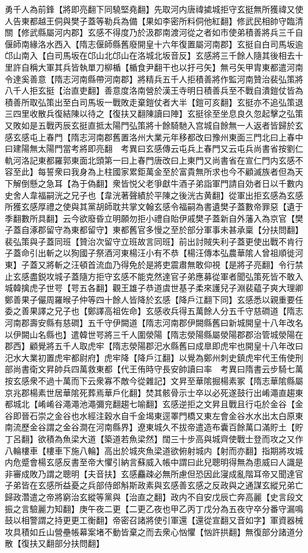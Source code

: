 勇千人為前鋒【將即亮翻下同驍堅堯翻】先取河内唐禕㨿城拒守玄挺無所獲禕又使人告東都越王侗與樊子蓋等勒兵為備【果如李密所料侗他紅翻】修武民相帥守臨清關【修武縣屬河内郡】玄感不得度乃於汲郡南渡河從之者如市使弟積善將兵三千自偃師南緣洛水西入【隋志偃師縣舊廢開皇十六年復置屬河南郡】玄挺自白司馬坂逾邙山南入【白司馬坂在邙山北邙山在洛城北坂音反】玄感將三千餘人隨其後相去十里許自稱大軍其兵皆執單刀柳楯【楯食尹翻干也以扜弓矢】無弓矢甲胄東都遣河南令達奚善意【隋志河南縣帶河南郡】將精兵五千人拒積善將作監河南贊治裴弘策將八千人拒玄挺【治直吏翻】善意度洛南營於漢王寺明日積善兵至不戰自潰鎧仗皆為積善所取弘策出至白司馬坂一戰敗走棄鎧仗者大半【鎧可亥翻】玄挺亦不追弘策退三四里收散兵復結陳以待之【復扶又翻陳讀曰陣】玄挺徐至坐息良久忽起擊之弘策又敗如是五戰丙辰玄挺直抵太陽門弘策將十餘騎馳入宫城自餘無一人返者皆歸於玄感玄感屯上春門【隋志河南郡舊置洛州大業元年移都改曰豫州東面三門北曰上春中曰建陽無太陽門當考將即亮翻　考異曰玄感傳云屯兵上春門又云屯兵尚書省按劉仁軌河洛記東都羅郭東面北頭第一曰上春門唐改曰上東門又尚書省在宣仁門内玄感不容至此】每誓衆曰我身為上柱國家累鉅萬金至於富貴無所求也今不顧滅族者但為天下解倒懸之急耳【為于偽翻】衆皆悦父老爭獻牛酒子弟詣軍門請自効者日以千數内史舍人韋福嗣洸之兄子也【韋洸著聲績於平陳之後洸古黄翻】從軍出拒玄感為玄感所獲玄感厚禮之使與其黨胡師耽共掌文翰玄感令福嗣為書遺樊子蓋數帝罪惡【遺于季翻數所具翻】云今欲廢昏立明願勿拒小禮自貽伊戚樊子蓋新自外藩入為京官【樊子蓋自涿郡留守為東都留守】東都舊官多慢之至於部分軍事未甚承稟【分扶問翻】裴弘策與子蓋同班【贊治次留守立班故言同班】前出討賊失利子蓋更使出戰不肯行子蓋命引出斬之以狥國子祭酒河東楊汪小有不恭【楊汪傳本弘農華隂人曾祖順徙河東】子蓋又將斬之汪頓首流血乃得免於是將吏震肅無敢仰視【是將子亮翻】令行禁止玄感盡鋭攻城子蓋隨方拒守玄感不能克然達官子弟應募從軍者聞弘策死皆不敢入城韓擒虎子世咢【咢五各翻】觀王雄子恭道虞世基子柔來護兒子淵裴藴子爽大理卿鄭善果子儼周羅㬋子仲等四十餘人皆降於玄感【降戶江翻下同】玄感悉以親重要任委之善果譯之兄子也【鄭譯高祖佐命】玄感收兵得五萬餘人分五千守慈磵道【隋志河南郡壽安縣有慈磵】五千守伊闕道【隋志河南郡伊闕縣舊曰新城開皇十八年改名以伊闕山名縣也】遣韓世咢將三千人圍滎陽【隋志滎陽縣屬滎陽郡郡治管城滎陽在郡西】顧覺將五千人取虎牢【隋志滎陽郡汜水縣舊曰成臯即虎牢也開皇十八年改曰汜水大業初置虎牢都尉府】虎牢降【降戶江翻】以覺為鄭州刺史鎮虎牢代王侑使刑部尚書衛文昇帥兵四萬救東都【代王侑時守長安帥讀曰率　考異曰隋書云步騎七萬按玄感衆不過十萬而下云衆寡不敵今從雜記】文昇至華隂掘楊素冢【隋志華隂縣屬京兆郡楊素世居華隂死葬焉華戶化翻】焚其骸骨示士卒以必死遂鼓行出崤澠直趨東都城北【崤崤谷澠澠池澠彌兖翻趨七喻翻】玄感逆拒之文昇且戰且行屯於金谷【金谷即晉石崇之金谷也水經注穀水自千金堨東逕睪門橋又東左會金谷水水出太白原東南流歷金谷謂之金谷澗在河南縣界】遼東城久不拔帝遣造布囊百餘萬口滿貯土【貯丁呂翻】欲積為魚梁大道【築道若魚梁然】闊三十步高與城齊使戰士登而攻之又作八輪樓車【樓車下施八輪】高出於城夾魚梁道欲俯射城内【射而亦翻】指期將攻城内危蹙會楊玄感反書至帝大懼引納言蘇威入帳中謂曰此兒聰明得無為患威曰人識是非審成敗乃謂之聰明【夫音扶】玄感麤疎必無所慮但恐因此寖成亂階耳帝又聞達官子弟皆在玄感所益憂之兵部侍郎斛斯政素與玄感善玄感之反政與之通謀玄縱兄弟亡歸政濳遣之帝將窮治玄縱等黨與【治直之翻】政内不自安戊辰亡奔高麗【史言段文振之言驗麗力知翻】庚午夜二更【二更乙夜也甲乙丙丁戊分為五夜守卒分番守漏鳴鼓以相警謂之持更更工衡翻】帝密召諸將使引軍還【還從宣翻又音如字】軍資器械攻具積如丘山營壘帳幕案堵不動皆棄之而去衆心忷懼【忷許拱翻】無復部分諸道分散【復扶又翻部分扶問翻】